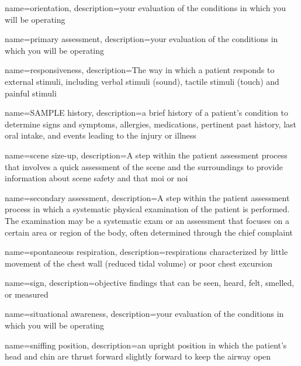 \documentclass[../../EMT-169.tex]{subfiles}
\begin{document}
	{
		name=orientation,
		description={your evaluation of the conditions in which you will be operating}
	}
	
	
	{
		name=primary assessment,
		description={your evaluation of the conditions in which you will be operating}
	}
	
	{
		name=responsiveness,
		description={The way in which a patient responds to external stimuli, including verbal stimuli (sound), tactile stimuli (touch) and painful stimuli}
	}
	
	{
		name=SAMPLE history,
		description={a brief history of a patient's condition to determine signs and symptoms, allergies, medications, pertinent past history, last oral intake, and events leading to the injury or illness}
	}
	
	{
		name=scene size-up,
		description={A step within the patient assessment process that involves a quick assessment of the scene and the surroundings to provide information about scene safety and that \acrfull{moi} or \acrfull{noi}}
	}
	
	{
		name=secondary assessment,
		description={A step within the patient assessment process in which a systematic physical examination of the patient is performed.  The examination may be a systematic exam or an assessment that focuses on a certain area or region of the body, often determined through the chief complaint}
	}
	
	{
		name=spontaneous respiration,
		description={respirations characterized by little movement of the chest wall (reduced tidal volume) or poor chest excursion}
	}
	
	{
		name=sign,
		description={objective findings that can be seen, heard, felt, smelled, or measured}
	}

	{
		name=situational awareness,
		description={your evaluation of the conditions in which you will be operating}
	}

	{
		name=sniffing position,
		description={an upright position in which the patient's head and chin are thrust forward slightly forward to keep the airway open}
	}
	
\end{document}
